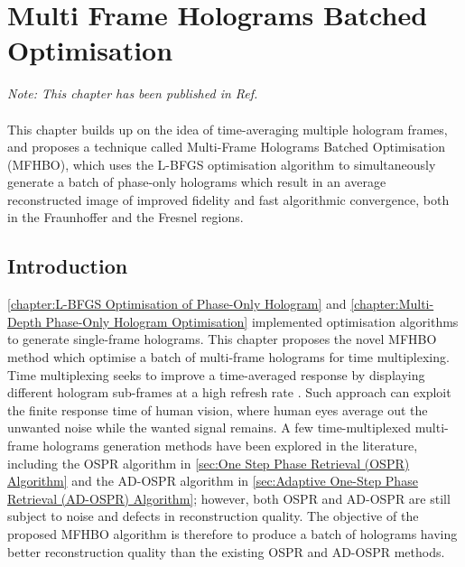 \chapter{Multi Frame Holograms Batched Optimisation}
\label{chapter:Multi Frame Holograms Batched Optimisation}

\graphicspath{{Chapter_MFHBO/Figs/}}

\textit{Note: This chapter has been published in Ref. \cite{Sha2024MFHBO}}\\\\

This chapter builds up on the idea of time-averaging multiple hologram frames, and proposes a technique called Multi-Frame Holograms Batched Optimisation (MFHBO), which uses the L-BFGS optimisation algorithm to simultaneously generate a batch of phase-only holograms which result in an average reconstructed image of improved fidelity and fast algorithmic convergence, both in the Fraunhoffer and the Fresnel regions.

\section{Introduction}
	\cref{chapter:L-BFGS Optimisation of Phase-Only Hologram} and \cref{chapter:Multi-Depth Phase-Only Hologram Optimisation} implemented optimisation algorithms to generate single-frame holograms. This chapter proposes the novel MFHBO method which optimise a batch of multi-frame holograms for time multiplexing. Time multiplexing seeks to improve a time-averaged response by displaying different hologram sub-frames at a high refresh rate \cite{Amako1995}. Such approach can exploit the finite response time of human vision, where human eyes average out the unwanted noise while the wanted signal remains. A few time-multiplexed multi-frame holograms generation methods have been explored in the literature, including the OSPR algorithm in \cref{sec:One Step Phase Retrieval (OSPR) Algorithm} and the AD-OSPR algorithm in \cref{sec:Adaptive One-Step Phase Retrieval (AD-OSPR) Algorithm}; however, both OSPR and AD-OSPR are still subject to noise and defects in reconstruction quality. The objective of the proposed MFHBO algorithm is therefore to produce a batch of holograms having better reconstruction quality than the existing OSPR and AD-OSPR methods.



